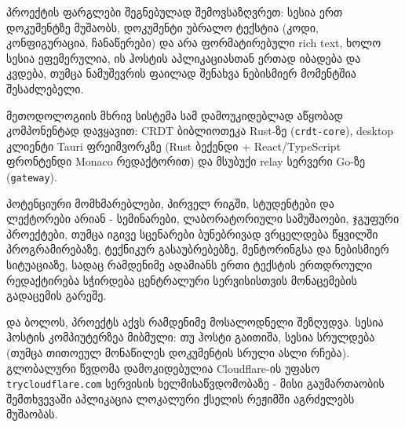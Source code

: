 პროექტის ფარგლები შეგნებულად შემოვსაზღვრეთ: სესია ერთ დოკუმენტზე მუშაობს,
დოკუმენტი უბრალო ტექსტია (კოდი, კონფიგურაცია, ჩანაწერები) და არა
ფორმატირებული rich text, ხოლო სესია ეფემერულია, ის ჰოსტის აპლიკაციასთან
ერთად იბადება და კვდება, თუმცა ნამუშევრის ფაილად შენახვა ნებისმიერ
მომენტშია შესაძლებელი.

მეთოდოლოგიის მხრივ სისტემა სამ დამოუკიდებლად აწყობად კომპონენტად დავყავით:
CRDT ბიბლიოთეკა Rust-ზე (\texttt{crdt-core}), desktop კლიენტი Tauri
ფრეიმვორკზე (Rust ბექენდი + React/TypeScript ფრონტენდი Monaco რედაქტორით)
და მსუბუქი relay სერვერი Go-ზე (\texttt{gateway}). 

პოტენციური მომხმარებლები, პირველ რიგში, სტუდენტები და ლექტორები არიან -
სემინარები, ლაბორატორიული სამუშაოები, ჯგუფური პროექტები, თუმცა იგივე
სცენარები ბუნებრივად ვრცელდება წყვილში პროგრამირებაზე, ტექნიკურ
გასაუბრებებზე, მენტორინგსა და ნებისმიერ სიტუაციაზე, სადაც რამდენიმე
ადამიანს ერთი ტექსტის ერთდროული რედაქტირება სჭირდება ცენტრალური
სერვისისთვის მონაცემების გადაცემის გარეშე.

და ბოლოს, პროექტს აქვს რამდენიმე მოსალოდნელი შეზღუდვა. სესია ჰოსტის
კომპიუტერზეა მიბმული: თუ ჰოსტი გაითიშა, სესია სრულდება (თუმცა თითოეულ
მონაწილეს დოკუმენტის სრული ასლი რჩება). გლობალური წვდომა დამოკიდებულია
Cloudflare-ის უფასო \texttt{trycloudflare.com} სერვისის ხელმისაწვდომობაზე -
მისი გაუმართაობის შემთხვევაში აპლიკაცია ლოკალური ქსელის რეჟიმში აგრძელებს
მუშაობას.
